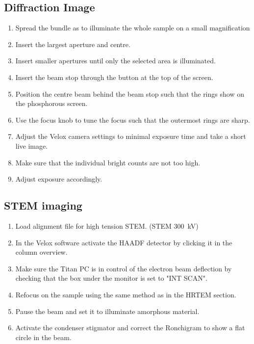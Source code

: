 \documentclass[a4paper]{scrartcl}
\begin{document}
\subsection*{Diffraction Image}
\begin{enumerate}
    \item Spread the bundle as to illuminate the whole sample on a small magnification
    \item Insert the largest aperture and centre.
    \item Insert smaller apertures until only the selected area is illuminated.
    \item Insert the beam stop through the button at the top of the screen.
    \item Position the centre beam behind the beam stop such that the rings show on the phosphorous screen.
    \item Use the focus knob to tune the focus such that the outermost rings are sharp.
    \item Adjust the Velox camera settings to minimal exposure time and take a short live image.
    \item Make sure that the individual bright counts are not too high.
    \item Adjust exposure accordingly.
    
\end{enumerate}

\subsection*{STEM imaging}
\begin{enumerate}
    \item Load alignment file for high tension STEM. (STEM \SI{300}{\kilo \volt})
    \item In the Velox software activate the HAADF detector by clicking it in the column overview.
    \item Make sure the Titan PC is in control of the electron beam deflection by checking that the box under the monitor is set to "INT SCAN".
    \item Refocus on the sample using the same method as in the HRTEM section.
    \item Pause the beam and set it to illuminate amorphous material.
    \item Activate the condenser stigmator and correct the Ronchigram to show a flat circle in the beam.
\end{enumerate}
\end{document}
